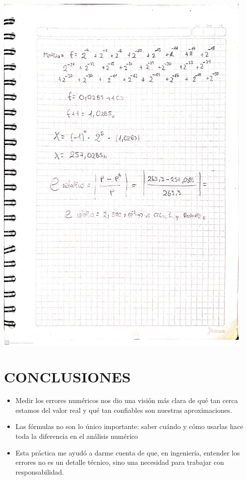 \documentclass[12pt]{article}
\begin{document}
\begin{minipage}{0.95\textwidth}
    \raggedleft
    \includegraphics[width=0.95\textwidth]{inFiles/Figures/ej2.jpeg}
\end{minipage}

\vspace{3cm}


\section*{CONCLUSIONES}
\begin{itemize}
    \item {Medir los errores numéricos nos dio una visión más clara de qué tan cerca estamos del valor real 
    y qué tan confiables son nuestras aproximaciones.}
     \item {Las fórmulas no son lo único importante: saber cuándo y cómo usarlas hace toda la diferencia en el análisis numérico}
     \item {Esta práctica me ayudó a darme cuenta de que, en ingeniería, entender los errores no es un detalle técnico, sino una necesidad 
     para trabajar con responsabilidad.}
\end{itemize}
\end{document}
